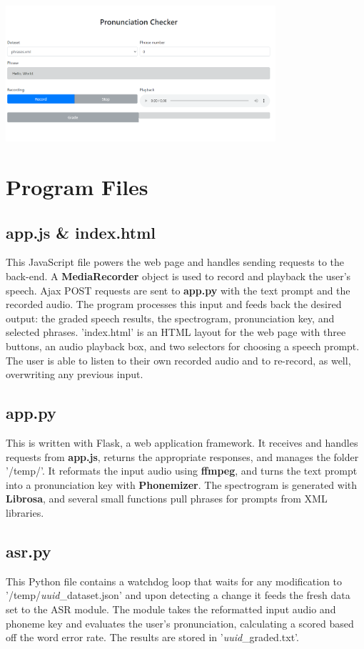 \documentclass[12pt, letterpaper]{article}
\begin{document}
\begin{center}
    \includegraphics[width=0.75\textwidth, center]{images/homepage.png}
\end{center}


\newpage%

\section*{Program Files}
\subsection*{app.js & index.html}
This JavaScript file powers the web page and handles sending requests to the back-end. A \textbf{MediaRecorder} object is used to record and playback the user's speech. Ajax POST requests are sent to \textbf{app.py} with the text prompt and the recorded audio. The program processes this input and feeds back the desired output: the graded speech results, the spectrogram, pronunciation key, and selected phrases. 'index.html' is an HTML layout for the web page with three buttons, an audio playback box, and two selectors for choosing a speech prompt. The user is able to listen to their own recorded audio and to re-record, as well, overwriting any previous input.

\subsection*{app.py}
This is written with Flask, a web application framework. It receives and handles requests from \textbf{app.js}, returns the appropriate responses, and manages the folder '/temp/'. It reformats the input audio using \textbf{ffmpeg}, and turns the text prompt into a pronunciation key with \textbf{Phonemizer}. The spectrogram is generated with \textbf{Librosa}, and several small functions pull phrases for prompts from XML libraries. 

\subsection*{asr.py}
This Python file contains a watchdog loop that waits for any modification to '/temp/\textit{uuid}\_dataset.json' and upon detecting a change it feeds the fresh data set to the ASR module. The module takes the reformatted input audio and phoneme key and evaluates the user's pronunciation, calculating a scored based off the word error rate. The results are stored in '\textit{uuid}\_graded.txt'.
\end{document}
